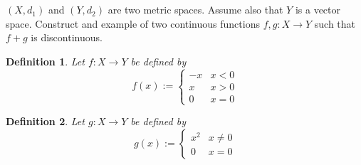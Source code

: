\documentclass[]{article}
\newtheorem{definition}{Definition}
\begin{document}
\newpage
\section{}
$(X,d_1)$ and $(Y,d_2)$ are two metric spaces.
Assume also that $Y$ is a vector space.
Construct and example of two continuous functions $f,g : X \to Y$ such that $f + g$ is discontinuous.

\begin{definition}
    Let $f : X \to Y$ be defined by
    \[
        f(x) := 
        \begin{cases}
            - x & x <0\\
            x & x > 0\\
            0 & x = 0
        \end{cases}
    \]
\end{definition}
\begin{definition}
    Let $g : X \to Y$ be defined by
    \[
        g(x) := 
        \begin{cases}
            x^2 & x \neq 0\\
            0 & x = 0
        \end{cases}
    \]
\end{definition}
\end{document}
